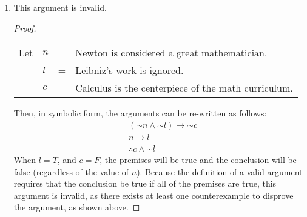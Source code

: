 \documentclass[11pt, notitlepage, leqno]{article}
\renewcommand{\neg}{\mathord{\sim}}
\begin{document}
\begin{enumerate}
\begin{enumerate}
\begin{proof}
Then, in symbolic form, the arguments can be re-written as follows:
\begin{align*}
& d \to h\\
& r \to c\\
& (h \vee c) \to v\\
& \neg v\\
& \overline{\therefore \neg d \wedge \neg r}
\end{align*}
From this, we can prove that if the premises are true, then Dominic didn't make it to the racetrack and Ralph didn't play cards all night:
\begin{align} \setcounter{equation}{0}
	& d \to h 			&& \textrm{Premise}\\
	& r \to c 			&& \textrm{Premise}\\
	& (h \vee c) \to v 	&& \textrm{Premise}\\
	& \neg v 			&& \textrm{Premise}\\
	& \neg (h \vee c) 	&& \textrm{[M.\ TOL] on 3, 4}\\
	& \neg h \wedge \neg c && \textrm{[DM] on 5}\\
	& \neg h 			&& \textrm{[SPEC] on 6}\\
	& \neg d 			&& \textrm{[M.\ TOL] on 1, 7}\\
	& \neg c 			&& \textrm{[SPEC] on 6}\\
	& \neg r 			&& \textrm{[M.\ TOL] on 2, 9}\\
	& \overline{\therefore \neg d \wedge \neg r} && \textrm{[CONJ] on 8, 10} \qedhere
\end{align}
\end{proof}

\item This argument is invalid.
\begin{proof}
\begin{tabular}[t]{llll}
Let & $n$ & = & Newton is considered a great mathematician. \\
& $l$ & = & Leibniz's work is ignored.           \\
& $c$ & = & Calculus is the centerpiece of the math curriculum.   \\
\end{tabular}

Then, in symbolic form, the arguments can be re-written as follows:
\begin{align*}
& (\neg n \wedge \neg l) \to \neg c\\
& n \to l\\
& \overline{\therefore c \wedge \neg l}
\end{align*}
When $l=T$, and $c=F$, the premises will be true and the conclusion will be false (regardless of the value of $n$). Because the definition of a valid argument requires that the conclusion be true if all of the premises are true, this argument is invalid, as there exists at least one counterexample to disprove the argument, as shown above.
\end{proof}

\end{enumerate}

\end{enumerate}
\end{document}
